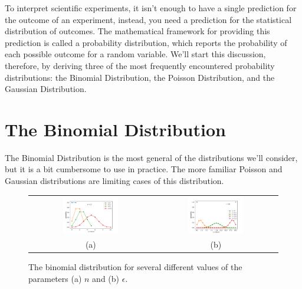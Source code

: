 \documentclass[12pt,oneside]{book}
\begin{document}
To interpret scientific experiments, it isn't enough to have a single
prediction for the outcome of an experiment, instead, you need a
prediction for the statistical distribution of outcomes.  The
mathematical framework for providing this prediction is called a
probability distribution, which reports the probability of each
possible outcome for a random variable.  We'll start this discussion,
therefore, by deriving three of the most frequently encountered
probability distributions: the Binomial Distribution, the Poisson
Distribution, and the Gaussian Distribution.

\section{The  Binomial Distribution}

The Binomial Distribution is the most general of the distributions
we'll consider, but it is a bit cumbersome to use in practice.  The
more familiar Poisson and Gaussian distributions are limiting cases of
this distribution.

\begin{figure}[htbp]
\begin{center}
\begin{tabular}{cc}
{\includegraphics[width=0.47\textwidth]{figs/binom_n.pdf}} &
{\includegraphics[width=0.47\textwidth]{figs/binom_eps.pdf}} \\
(a) & (b) \\
\end{tabular}
\end{center}
\caption{\label{fig:binom} The binomial distribution for several different values of the parameters (a) $n$ and (b) $\epsilon$.}
\end{figure}
\end{document}
